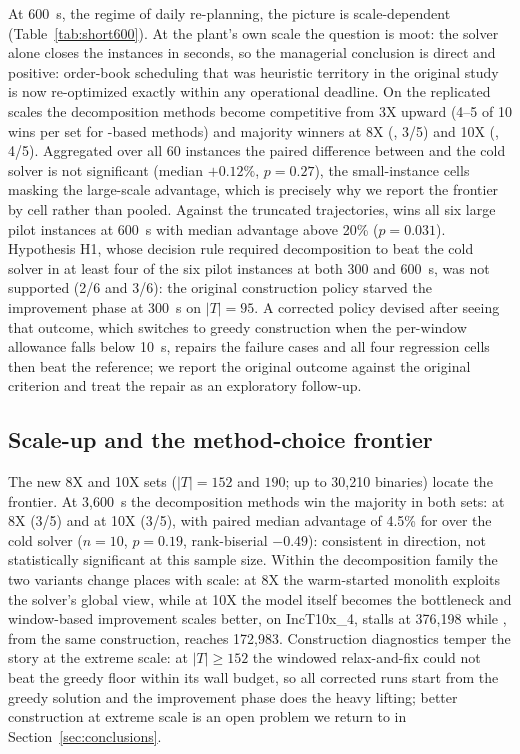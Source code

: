 At 600~s, the regime of daily re-planning, the picture is
scale-dependent (Table~\ref{tab:short600}). At the plant's own scale the question is moot:
the solver alone closes the instances in seconds, so the managerial
conclusion is direct and positive: order-book scheduling that was
heuristic territory in the original study is now re-optimized exactly
within any operational deadline. On the replicated scales
the decomposition methods become competitive from 3X upward (4--5 of
10 wins per set for \RF-based methods) and majority winners at 8X
(\RFMIP, 3/5) and 10X (\RFFO, 4/5). Aggregated over all 60 instances
the paired difference between \RFFO{} and the cold solver is not
significant (median $+0.12\%$, $p=0.27$), the small-instance cells
masking the large-scale advantage, which is precisely why we
report the frontier by cell rather than pooled. Against the
truncated \ILS{} trajectories, \RFFO{} wins all six large pilot
instances at 600~s with median advantage above 20\%
($p=0.031$). Hypothesis H1, whose decision rule required
decomposition to beat the cold solver in at least four of the six
pilot instances at both 300 and 600~s, was not supported (2/6 and
3/6): the original construction policy starved the improvement phase
at 300~s on $|T|=95$. A corrected policy devised after seeing that
outcome, which switches to greedy construction when the per-window
allowance falls below 10~s, repairs the failure cases and all four
regression cells then beat the \ILS{} reference; we report the
original outcome against the original criterion and treat the repair
as an exploratory follow-up.



\subsection{Scale-up and the method-choice frontier}
\label{sec:frontier}

The new 8X and 10X sets ($|T|=152$ and $190$; up to 30{,}210
binaries) locate the frontier. At 3{,}600~s the decomposition
methods win the majority in both sets: \RFMIP{} at 8X (3/5) and
\RFFO{} at 10X (3/5), with paired median advantage of 4.5\% for
\RFFO{} over the cold solver ($n=10$, $p=0.19$, rank-biserial
$-0.49$): consistent in direction, not statistically significant at
this sample size. Within the decomposition family the two variants
change places with scale: at 8X the warm-started monolith exploits
the solver's global view, while at 10X the model itself becomes the
bottleneck and window-based improvement scales better, on
IncT10x\_4, \RFMIP{} stalls at 376{,}198 while \RFFO{}, from the
same construction, reaches 172{,}983. Construction diagnostics
temper the story at the extreme scale: at $|T|\ge 152$ the windowed
relax-and-fix could not beat the greedy floor within its wall
budget, so all corrected runs start from the greedy solution and
the improvement phase does the heavy lifting; better construction
at extreme scale is an open problem we return to in
Section~\ref{sec:conclusions}.

